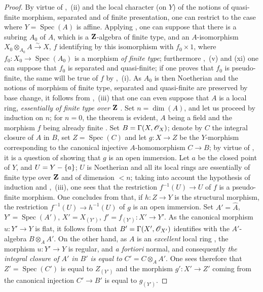 \begin{proof}
By virtue of ,~(ii) and the local character (on $Y$) of the notions of quasi-finite morphism, separated and of finite presentation, one can restrict to the case where $Y=\operatorname{Spec}(A)$ is affine.
Applying , one can suppose that there is a subring $A_0$ of $A$, which is a $\mathbf{Z}$-algebra of finite type, and an $A$-isomorphism $X_0\otimes_{A_0}A\xrightarrow{\sim}X$, $f$ identifying by this isomorphism with $f_0\times 1$, where $f_0:X_0\to\operatorname{Spec}(A_0)$ is a morphism \emph{of finite type}; furthermore ,~(v) and (xi) one can suppose that $f_0$ is separated and quasi-finite; if one proves that $f_0$ is pseudo-finite, the same will be true of $f$ by ,~(i).
As $A_0$ is then Noetherian and the notions of morphism of finite type, separated and quasi-finite are preserved by base change, it follows from ,~(iii) that one can even suppose that $A$ is a local ring, \emph{essentially of finite type over} $\mathbf{Z}$ .
Set $n=\dim(A)$, and let us proceed by induction on $n$; for $n=0$, the theorem is evident, $A$ being a field and the morphism $f$ being already finite .
Set $B=\Gamma(X,\mathscr{O}_X)$; denote by $C$ the integral closure of $A$ in $B$, set $Z=\operatorname{Spec}(C)$ and let $g:X\to Z$ be the $Y$-morphism corresponding to the canonical injective $A$-homomorphism $C\to B$; by virtue of , it is a question of showing that $g$ is an open immersion.
Let $a$ be the closed point of $Y$, and $U=Y-\{a\}$; $U$ is Noetherian and all its local rings are essentially of finite type over $\mathbf{Z}$ and of dimension $<n$; taking into account the hypothesis of induction and ,~(iii), one sees that the restriction $f^{-1}(U)\to U$ of $f$ is a pseudo-finite morphism.
One concludes from  that, if $h:Z\to Y$ is the structural morphism, the restriction $f^{-1}(U)\to h^{-1}(U)$ of $g$ is an open immersion.
Set $A'=\hat{A}$, $Y'=\operatorname{Spec}(A')$, $X'=X_{(Y')}$, $f'=f_{(Y')}:X'\to Y'$.
As the canonical morphism $u:Y'\to Y$ is flat, it follows from  that $B'=\Gamma(X',\mathscr{O}_{X'})$ identifies with the $A'$-algebra $B\otimes_A A'$.
On the other hand, as $A$ is an \emph{excellent} local ring , the morphism $u:Y'\to Y$ is regular, and \emph{a fortiori} normal, and consequently  \emph{the integral closure of $A'$ in $B'$ is equal to} $C'=C\otimes_A A'$.
One sees therefore that $Z'=\operatorname{Spec}(C')$ is equal to $Z_{(Y')}$ and the morphism $g':X'\to Z'$ coming from the canonical injection $C'\to B'$ is equal to $g_{(Y')}$.

\end{proof}
